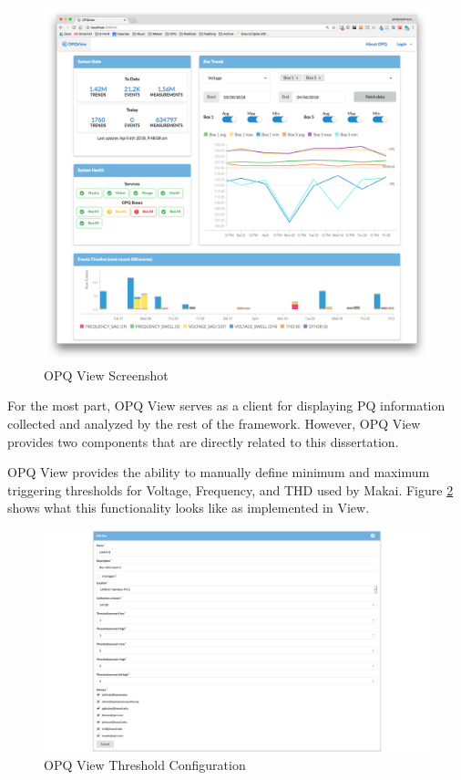 \begin{figure}
	\centering
	\includegraphics[width=1\linewidth]{figures/opqview-landing-page.png}
	\caption{OPQ View Screenshot}\label{fig:opq-view}
\end{figure}

For the most part, OPQ View serves as a client for displaying PQ information collected and analyzed by the rest of the framework. However, OPQ View provides two components that are directly related to this dissertation. 

OPQ View provides the ability to manually define minimum and maximum triggering thresholds for Voltage, Frequency, and THD used by Makai. Figure \ref{fig:view_thresholds} shows what this functionality looks like as implemented in View.

\begin{figure}
	\centering
	\includegraphics[width=1\linewidth]{figures/view_thresholds.png}
	\caption{OPQ View Threshold Configuration}\label{fig:view_thresholds}
\end{figure}

